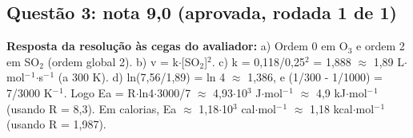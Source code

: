 \documentclass{article}%
\begin{document}
\subsection*{Questão 3: nota 9,0 (aprovada, rodada 1 de 1)}%
\textbf{Resposta da resolução às cegas do avaliador:} a) Ordem 0 em O$_{3}$ e ordem 2 em SO$_{2}$ (ordem global 2).\newline%
b) v = k$\cdot${[}SO$_{2}${]}$^2$.\newline%
c) k = 0,118/0,25$^2$ = 1,888 $\approx$ 1,89 L$\cdot$mol$^{-}$$^{1}$$\cdot$s$^{-}$$^{1}$ (a 300 K).\newline%
d) ln(7,56/1,89) = ln 4 $\approx$ 1,386, e (1/300 - 1/1000) = 7/3000 K$^{-}$$^{1}$. Logo Ea = R$\cdot$ln4$\cdot$3000/7 $\approx$ 4,93$\cdot$10$^3$ J$\cdot$mol$^{-}$$^{1}$ $\approx$ 4,9 kJ$\cdot$mol$^{-}$$^{1}$ (usando R = 8,3). Em calorias, Ea $\approx$ 1,18$\cdot$10$^3$ cal$\cdot$mol$^{-}$$^{1}$ $\approx$ 1,18 kcal$\cdot$mol$^{-}$$^{1}$ (usando R = 1,987).\par %
\end{document}
